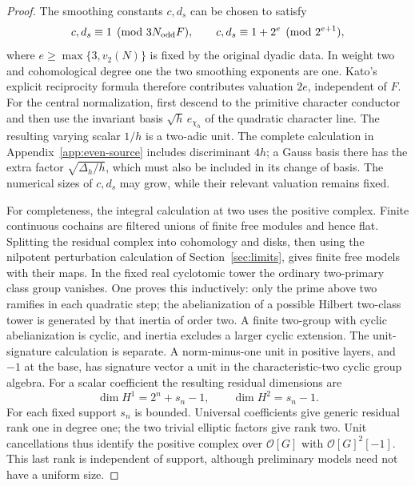 \documentclass[11pt]{article}
\theoremstyle{definition}
\theoremstyle{remark}
\providecommand{\mathscr}[1]{\mathcal{#1}}
\begin{document}
\begin{proof}
The smoothing constants $c,d_s$ can be chosen to satisfy
\[
 c,d_s\equiv1\pmod {3N_{\rm odd}F},\qquad
 c,d_s\equiv1+2^e\pmod {2^{e+1}},
\]
where $e\ge\max\{3,v_2(N)\}$ is fixed by the original dyadic data.
In weight two and
cohomological degree one the two smoothing exponents are one.
Kato's explicit reciprocity formula therefore contributes valuation
$2e$, independent of $F$. For the central normalization, first descend
to the primitive character conductor and then use the invariant basis
$\sqrt h\,e_{\chi_h}$ of the quadratic character line. The resulting
varying scalar $1/h$ is a two-adic unit. The complete calculation in
Appendix~\ref{app:even-source} includes discriminant $4h$; a Gauss basis
there has the extra factor $\sqrt{\Delta_h/h}$, which must also be
included in its change of basis. The numerical sizes of $c,d_s$ may
grow, while their relevant valuation remains fixed.

For completeness, the integral calculation at two uses the positive
complex. Finite continuous cochains are filtered unions of finite free
modules and hence flat. Splitting the residual complex into cohomology
and disks, then using the nilpotent perturbation calculation of
Section~\ref{sec:limits}, gives finite free models with their maps.
In the fixed real cyclotomic tower the ordinary two-primary class group
vanishes. One proves this inductively: only the prime above two ramifies
in each quadratic step; the abelianization of a possible Hilbert
two-class tower is generated by that inertia of order two. A finite
two-group with cyclic abelianization is cyclic, and inertia excludes a
larger cyclic extension. The unit-signature calculation is separate.
A norm-minus-one unit in positive layers, and $-1$ at the base, has
signature vector a unit in the characteristic-two cyclic group algebra.
For a scalar coefficient the resulting residual dimensions are
\[
 \dim H^1=2^n+s_n-1,\qquad \dim H^2=s_n-1.
\]
For each fixed support $s_n$ is bounded. Universal coefficients give
generic residual rank one in degree one; the two trivial elliptic
factors give rank two. Unit cancellations thus identify the positive
complex over $\mathscr O[G]$ with $\mathscr O[G]^2[-1]$.
This last rank is independent of support, although preliminary models
need not have a uniform size.


\end{proof}
\end{document}
